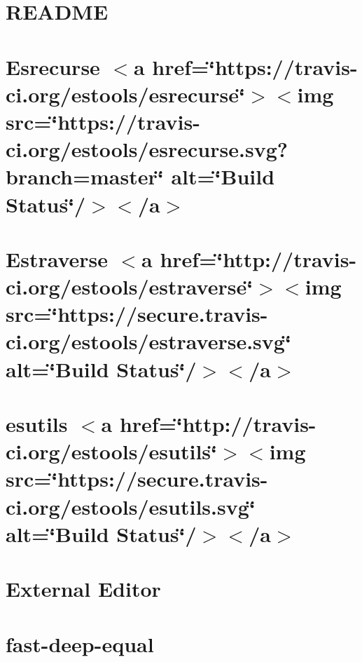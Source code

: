 \let\mypdfximage\pdfximage\def\pdfximage{\immediate\mypdfximage}\documentclass[twoside]{book}
\newcommand{\+}{\discretionary{\mbox{\scriptsize$\hookleftarrow$}}{}{}}
\begin{document}
\chapter{R\+E\+A\+D\+ME}
\label{md_heap-visualizer_node_modules_esquery__r_e_a_d_m_e}

\chapter{Esrecurse $<$a href=\char`\"{}https\+://travis-\/ci.\+org/estools/esrecurse\char`\"{}$>$$<$img src=\char`\"{}https\+://travis-\/ci.\+org/estools/esrecurse.\+svg?branch=master\char`\"{} alt=\char`\"{}\+Build Status\char`\"{}/$>$$<$/a$>$}
\label{md_heap-visualizer_node_modules_esrecurse__r_e_a_d_m_e}

\chapter{Estraverse $<$a href=\char`\"{}http\+://travis-\/ci.\+org/estools/estraverse\char`\"{}$>$$<$img src=\char`\"{}https\+://secure.\+travis-\/ci.\+org/estools/estraverse.\+svg\char`\"{} alt=\char`\"{}\+Build Status\char`\"{}/$>$$<$/a$>$}
\label{md_heap-visualizer_node_modules_estraverse__r_e_a_d_m_e}

\chapter{esutils $<$a href=\char`\"{}http\+://travis-\/ci.\+org/estools/esutils\char`\"{}$>$$<$img src=\char`\"{}https\+://secure.\+travis-\/ci.\+org/estools/esutils.\+svg\char`\"{} alt=\char`\"{}\+Build Status\char`\"{}/$>$$<$/a$>$}
\label{md_heap-visualizer_node_modules_esutils__r_e_a_d_m_e}

\chapter{External Editor}
\label{md_heap-visualizer_node_modules_external-editor__r_e_a_d_m_e}

\chapter{fast-\/deep-\/equal}
\label{md_heap-visualizer_node_modules_fast-deep-equal__r_e_a_d_m_e}

\end{document}
